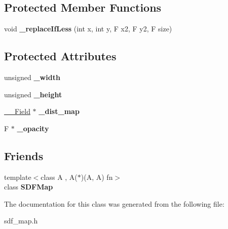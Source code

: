 \subsection*{Protected Member Functions}
\begin{DoxyCompactItemize}
\item 
\hypertarget{classSDFMap_a18c054fb1d5e9f6aa6b7b47b8f079f82}{}void {\bfseries \+\_\+replace\+If\+Less} (int x, int y, F x2, F y2, F size)\label{classSDFMap_a18c054fb1d5e9f6aa6b7b47b8f079f82}

\end{DoxyCompactItemize}
\subsection*{Protected Attributes}
\begin{DoxyCompactItemize}
\item 
\hypertarget{classSDFMap_a312dd49c6beadcc44326fa56c0bfda81}{}unsigned {\bfseries \+\_\+width}\label{classSDFMap_a312dd49c6beadcc44326fa56c0bfda81}

\item 
\hypertarget{classSDFMap_abcd6404b0c970be876597f00126b3b15}{}unsigned {\bfseries \+\_\+height}\label{classSDFMap_abcd6404b0c970be876597f00126b3b15}

\item 
\hypertarget{classSDFMap_a024fee6c39dc64bb064db2db351acb93}{}\hyperlink{structSDFMap_1_1____Field}{\+\_\+\+\_\+\+Field} $\ast$ {\bfseries \+\_\+dist\+\_\+map}\label{classSDFMap_a024fee6c39dc64bb064db2db351acb93}

\item 
\hypertarget{classSDFMap_aff26b8faad5b3d795c341318380df327}{}F $\ast$ {\bfseries \+\_\+opacity}\label{classSDFMap_aff26b8faad5b3d795c341318380df327}

\end{DoxyCompactItemize}
\subsection*{Friends}
\begin{DoxyCompactItemize}
\item 
\hypertarget{classSDFMap_a22d0449b78e082b0fefe3b8be1607226}{}{\footnotesize template$<$class A , A($\ast$)(\+A, A) fn$>$ }\\class {\bfseries S\+D\+F\+Map}\label{classSDFMap_a22d0449b78e082b0fefe3b8be1607226}

\end{DoxyCompactItemize}


The documentation for this class was generated from the following file\+:\begin{DoxyCompactItemize}
\item 
sdf\+\_\+map.\+h\end{DoxyCompactItemize}

